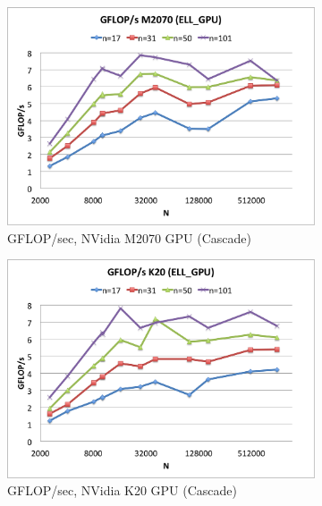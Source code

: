 \documentclass{report}
\begin{document}
\begin{figure} 
\centering
\begin{subfigure}[t]{0.48\textwidth}
\centering
\includegraphics[width=\textwidth]{gpu_content/cascade_spmv/ell_comparison_cascade_m2070.png}
\caption{GFLOP/sec, NVidia M2070 GPU (Cascade)}
\label{fig:ell_gflops_cascade_m2070}
\end{subfigure}
\quad
\begin{subfigure}[t]{0.48\textwidth}
\centering
\includegraphics[width=\textwidth]{gpu_content/cascade_spmv/ell_comparison_cascade_k20.png}
\caption{GFLOP/sec, NVidia K20 GPU (Cascade)}
\label{fig:ell_gflops_cascade_k20}
\end{subfigure}
\begin{subfigure}[t]{0.48\textwidth}
\centering

\end{subfigure}
\end{figure}
\end{document}
